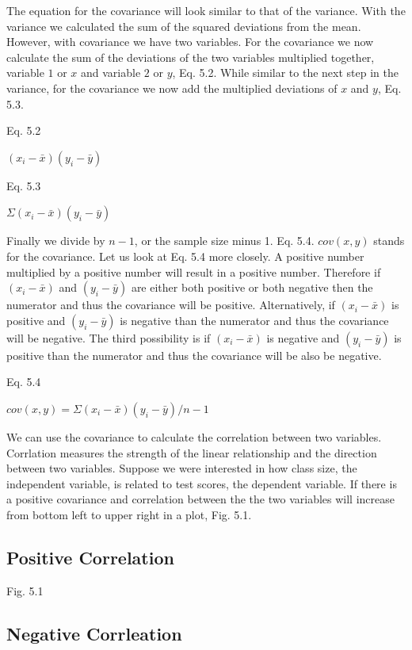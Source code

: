 \documentclass[]{book}
\theoremstyle{definition}
\theoremstyle{definition}
\theoremstyle{definition}
\theoremstyle{remark}
\begin{document}
The equation for the covariance will look similar to that of the
variance. With the variance we calculated the sum of the squared
deviations from the mean. However, with covariance we have two
variables. For the covariance we now calculate the sum of the deviations
of the two variables multiplied together, variable \(1\) or \(x\) and
variable \(2\) or \(y\), Eq. 5.2. While similar to the next step in the
variance, for the covariance we now add the multiplied deviations of
\(x\) and \(y\), Eq. 5.3.

Eq. 5.2

\((x_{i} - \bar{x})(y_{i} - \bar{y})\)

Eq. 5.3

\(\Sigma(x_{i} - \bar{x})(y_{i} - \bar{y})\)

Finally we divide by \(n-1\), or the sample size minus 1. Eq. 5.4.
\(cov(x,y)\) stands for the covariance. Let us look at Eq. 5.4 more
closely. A positive number multiplied by a positive number will result
in a positive number. Therefore if \((x_{i} - \bar{x})\) and
\((y_{i} - \bar{y})\) are either both positive or both negative then the
numerator and thus the covariance will be positive. Alternatively, if
\((x_{i} - \bar{x})\) is positive and \((y_{i} - \bar{y})\) is negative
than the numerator and thus the covariance will be negative. The third
possibility is if \((x_{i} - \bar{x})\) is negative and
\((y_{i} - \bar{y})\) is positive than the numerator and thus the
covariance will be also be negative.

Eq. 5.4

\(cov(x,y)=\Sigma(x_{i} - \bar{x})(y_{i} - \bar{y})/n-1\)

We can use the covariance to calculate the correlation between two
variables. Corrlation measures the strength of the linear relationship
and the direction between two variables. Suppose we were interested in
how class size, the independent variable, is related to test scores, the
dependent variable. If there is a positive covariance and correlation
between the the two variables will increase from bottom left to upper
right in a plot, Fig. 5.1.

\hypertarget{positive-correlation}{%
\subsection{Positive Correlation}\label{positive-correlation}}

Fig. 5.1

\hypertarget{negative-corrleation}{%
\subsection{Negative Corrleation}\label{negative-corrleation}}
\end{document}
